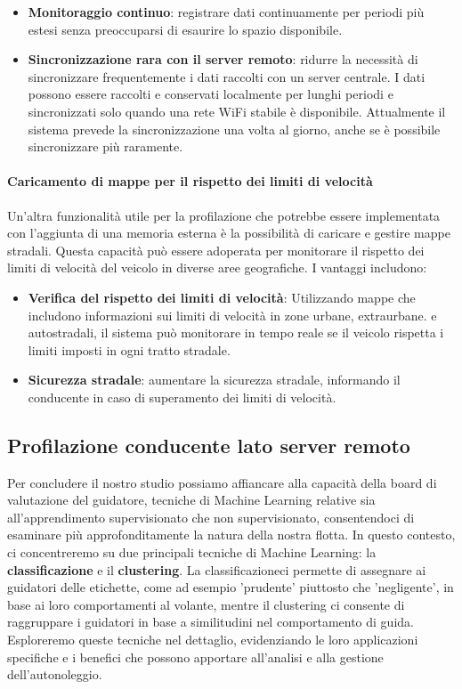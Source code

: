 \documentclass[12pt, a4paper, italian]{report}
\numberwithin{figure}{chapter}
\numberwithin{table}{chapter}
\begin{document}
\begin{itemize}
    \item \textbf{Monitoraggio continuo}: registrare dati continuamente per periodi più estesi senza preoccuparsi di esaurire lo spazio disponibile.
    \item \textbf{Sincronizzazione rara con il server remoto}: ridurre la necessità di sincronizzare frequentemente i dati raccolti con un server centrale. I dati possono essere raccolti e conservati localmente per lunghi periodi e sincronizzati solo quando una rete WiFi stabile è disponibile. Attualmente il sistema prevede la sincronizzazione una volta al giorno, anche se è possibile sincronizzare più raramente.
\end{itemize}

\paragraph{Caricamento di mappe per il rispetto dei limiti di velocità} 
Un'altra funzionalità utile per la profilazione che potrebbe essere implementata con l'aggiunta di una memoria esterna è la possibilità di caricare e gestire mappe stradali. Questa capacità può essere adoperata per monitorare il rispetto dei limiti di velocità del veicolo in diverse aree geografiche. I vantaggi includono:

\begin{itemize}
    \item \textbf{Verifica del rispetto dei limiti di velocità}: Utilizzando mappe che includono informazioni sui limiti di velocità in zone urbane, extraurbane. e autostradali, il sistema può monitorare in tempo reale se il veicolo rispetta i limiti imposti in ogni tratto stradale.
    \item \textbf{Sicurezza stradale}: aumentare la sicurezza stradale, informando il conducente in caso di superamento dei limiti di velocità. 
\end{itemize}

\subsection{Profilazione conducente lato server remoto} 
Per concludere il nostro studio possiamo affiancare alla capacità della board di valutazione del guidatore, tecniche di Machine Learning relative sia all'apprendimento supervisionato che non supervisionato, consentendoci di esaminare più approfonditamente la natura della nostra flotta. In questo contesto, ci concentreremo su due principali tecniche di Machine Learning: la \textbf{classificazione} e il \textbf{clustering}. La classificazioneci permette di assegnare ai guidatori delle etichette, come ad esempio 'prudente' piuttosto che 'negligente', in base ai loro comportamenti al volante, mentre il clustering ci consente di raggruppare i guidatori in base a similitudini nel comportamento di guida. Esploreremo queste tecniche nel dettaglio, evidenziando le loro applicazioni specifiche e i benefici che possono apportare all'analisi e alla gestione dell'autonoleggio. \cite{wiki:Apprendimento_automatico}
\end{document}
